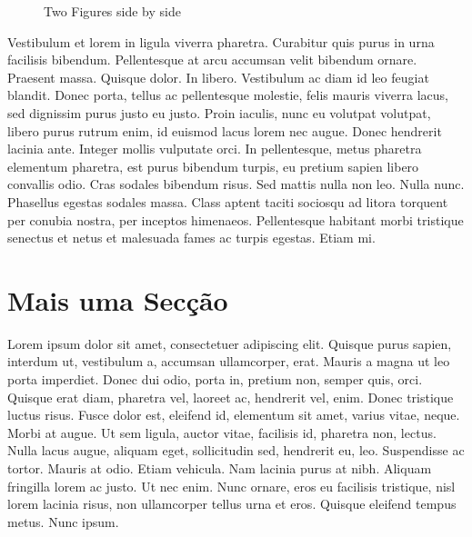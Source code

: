\begin{figure}
  \qquad
  \caption{Two Figures side by side}
  \label{fig:2figs}
\end{figure}

Vestibulum et lorem in ligula viverra pharetra. Curabitur quis purus
in urna facilisis bibendum. Pellentesque at arcu accumsan velit
bibendum ornare. Praesent massa. Quisque dolor. In libero. Vestibulum
ac diam id leo feugiat blandit. Donec porta, tellus ac pellentesque
molestie, felis mauris viverra lacus, sed dignissim purus justo eu
justo. Proin iaculis, nunc eu volutpat volutpat, libero purus rutrum
enim, id euismod lacus lorem nec augue. Donec hendrerit lacinia
ante. Integer mollis vulputate orci. In pellentesque, metus pharetra
elementum pharetra, est purus bibendum turpis, eu pretium sapien
libero convallis odio. Cras sodales bibendum risus. Sed mattis nulla
non leo. Nulla nunc. Phasellus egestas sodales massa. Class aptent
taciti sociosqu ad litora torquent per conubia nostra, per inceptos
himenaeos. Pellentesque habitant morbi tristique senectus et netus et
malesuada fames ac turpis egestas. Etiam mi. 

\section{Mais uma Secção}

Lorem ipsum dolor sit amet, consectetuer adipiscing elit. Quisque
purus sapien, interdum ut, vestibulum a, accumsan ullamcorper,
erat. Mauris a magna ut leo porta imperdiet. Donec dui odio, porta in,
pretium non, semper quis, orci. Quisque erat diam, pharetra vel,
laoreet ac, hendrerit vel, enim. Donec tristique luctus risus. Fusce
dolor est, eleifend id, elementum sit amet, varius vitae, neque. Morbi
at augue. Ut sem ligula, auctor vitae, facilisis id, pharetra non,
lectus. Nulla lacus augue, aliquam eget, sollicitudin sed, hendrerit
eu, leo. Suspendisse ac tortor. Mauris at odio. Etiam vehicula. Nam
lacinia purus at nibh. Aliquam fringilla lorem ac justo. Ut nec
enim. Nunc ornare, eros eu facilisis tristique, nisl lorem lacinia
risus, non ullamcorper tellus urna et eros. Quisque eleifend tempus
metus. Nunc ipsum. 

